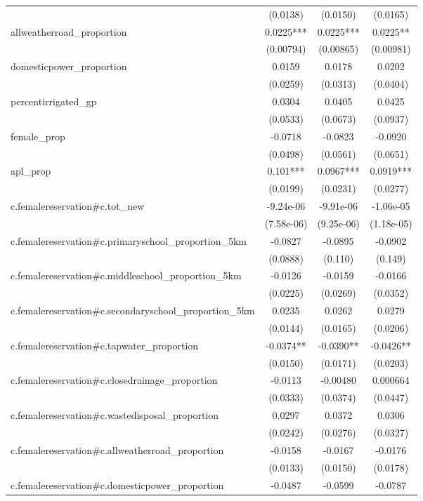 \begin{tabular}{lccc}
 & (0.0138) & (0.0150) & (0.0165) \\
allweatherroad\_proportion & 0.0225*** & 0.0225*** & 0.0225** \\
 & (0.00794) & (0.00865) & (0.00981) \\
domesticpower\_proportion & 0.0159 & 0.0178 & 0.0202 \\
 & (0.0259) & (0.0313) & (0.0404) \\
percentirrigated\_gp & 0.0304 & 0.0405 & 0.0425 \\
 & (0.0533) & (0.0673) & (0.0937) \\
female\_prop & -0.0718 & -0.0823 & -0.0920 \\
 & (0.0498) & (0.0561) & (0.0651) \\
apl\_prop & 0.101*** & 0.0967*** & 0.0919*** \\
 & (0.0199) & (0.0231) & (0.0277) \\
c.femalereservation\#c.tot\_new & -9.24e-06 & -9.91e-06 & -1.06e-05 \\
 & (7.58e-06) & (9.25e-06) & (1.18e-05) \\
c.femalereservation\#c.primaryschool\_proportion\_5km & -0.0827 & -0.0895 & -0.0902 \\
 & (0.0888) & (0.110) & (0.149) \\
c.femalereservation\#c.middleschool\_proportion\_5km & -0.0126 & -0.0159 & -0.0166 \\
 & (0.0225) & (0.0269) & (0.0352) \\
c.femalereservation\#c.secondaryschool\_proportion\_5km & 0.0235 & 0.0262 & 0.0279 \\
 & (0.0144) & (0.0165) & (0.0206) \\
c.femalereservation\#c.tapwater\_proportion & -0.0374** & -0.0390** & -0.0426** \\
 & (0.0150) & (0.0171) & (0.0203) \\
c.femalereservation\#c.closedrainage\_proportion & -0.0113 & -0.00480 & 0.000664 \\
 & (0.0333) & (0.0374) & (0.0447) \\
c.femalereservation\#c.wastedisposal\_proportion & 0.0297 & 0.0372 & 0.0306 \\
 & (0.0242) & (0.0276) & (0.0327) \\
c.femalereservation\#c.allweatherroad\_proportion & -0.0158 & -0.0167 & -0.0176 \\
 & (0.0133) & (0.0150) & (0.0178) \\
c.femalereservation\#c.domesticpower\_proportion & -0.0487 & -0.0599 & -0.0787 \\

\end{tabular}
